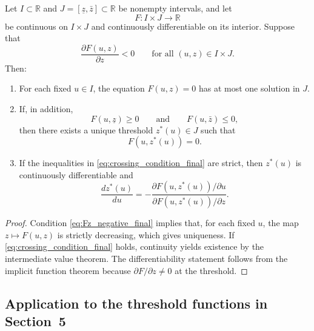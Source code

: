 \begin{lemma}
\label{lem:generic_threshold_final}
Let $I\subset \mathbb R$ and $J=[\underline z,\bar z]\subset \mathbb R$ be
nonempty intervals, and let
\[
F:I\times J\to \mathbb R
\]
be continuous on $I\times J$ and continuously differentiable on its interior.
Suppose that
\begin{equation}
\frac{\partial F(u,z)}{\partial z}<0
\qquad
\text{for all }(u,z)\in I\times J.
\label{eq:Fz_negative_final}
\end{equation}
Then:

\begin{enumerate}
    \item For each fixed $u\in I$, the equation $F(u,z)=0$ has at most one
    solution in $J$.

    \item If, in addition,
    \begin{equation}
    F(u,\underline z)\ge 0
    \qquad\text{and}\qquad
    F(u,\bar z)\le 0,
    \label{eq:crossing_condition_final}
    \end{equation}
    then there exists a unique threshold $z^*(u)\in J$ such that
    \[
    F(u,z^*(u))=0.
    \]

    \item If the inequalities in \eqref{eq:crossing_condition_final} are
    strict, then $z^*(u)$ is continuously differentiable and
    \begin{equation}
    \frac{dz^*(u)}{du}
    =
    -\frac{\partial F(u,z^*(u))/\partial u}
    {\partial F(u,z^*(u))/\partial z}.
    \label{eq:implicit_formula_final}
    \end{equation}
\end{enumerate}
\end{lemma}

\begin{proof}
Condition \eqref{eq:Fz_negative_final} implies that, for each fixed $u$, the
map $z\mapsto F(u,z)$ is strictly decreasing, which gives uniqueness. If
\eqref{eq:crossing_condition_final} holds, continuity yields existence by the
intermediate value theorem. The differentiability statement follows from the
implicit function theorem because $\partial F/\partial z\neq 0$ at the
threshold.
\end{proof}

\subsection{Application to the threshold functions in Section~5}

